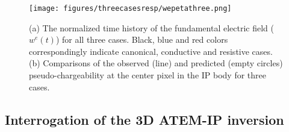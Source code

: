 \documentclass[a4paper, 11pt]{article}
\begin{document}
\begin{figure}[htb]
  \centering  \texttt{[image: figures/threecasesresp/wepetathree.png]}
  \caption{(a) The normalized time history of the fundamental electric field ($w^e(t)$) for all three cases. Black, blue and red colors correspondingly indicate canonical, conductive and resistive cases. (b) Comparisons of the observed (line) and predicted (empty circles) pseudo-chargeability at the center pixel in the IP body for three cases.}
  \label{F:wepetathree}
\end{figure}
\subsection{Interrogation of the 3D ATEM-IP inversion}
\end{document}
